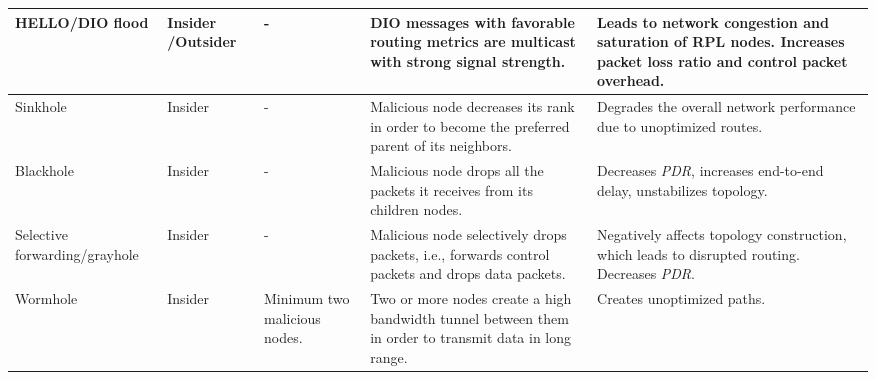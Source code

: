 \documentclass[10pt,journal,sort & compress]{IEEEtran}
\begin{document}
\begin{table*}
\begin{supertabular}[l]{|p{1.6cm}|p{1.3cm}|p{1.5cm}|p{5.8cm}|p{5.8cm}|}
		HELLO/DIO flood               & Insider
		/Outsider & -                            & DIO messages with favorable routing metrics are multicast with strong signal strength.                                                                                                              & Leads to network congestion and saturation of RPL nodes. Increases packet loss ratio and control packet overhead.                                                                                                    \\ \hline
		Sinkhole                      & Insider          & -                            & Malicious node decreases its rank in order to become the preferred parent of its neighbors.                                                                                                  & Degrades the overall network performance due to unoptimized routes.                                                                                                                                              \\ \hline
		Blackhole                     & Insider          & -                            & Malicious node drops all the packets it receives from its children nodes.                                                                                                                             & Decreases \textit{PDR}, increases end-to-end delay, unstabilizes topology.                                                                                                                                  \\ \hline
		Selective forwarding/grayhole & Insider          & -                            & Malicious node selectively drops packets, i.e., forwards control packets and drops data packets.                                                                                         & Negatively affects topology construction, which leads to disrupted routing. Decreases \textit{PDR}.                                                                                                          \\ \hline
		Wormhole                      & Insider          & Minimum two malicious nodes. & Two or more nodes create a high bandwidth tunnel between them in order to transmit data in long range.                                                                                                   & Creates unoptimized paths.                                                                                                                                                                                            \\ \hline

\end{supertabular}
\end{table*}
\end{document}
